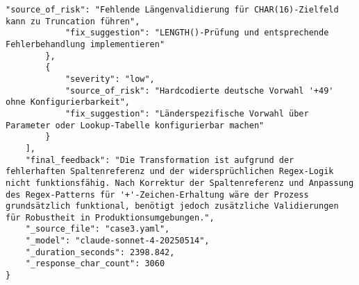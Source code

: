 \begin{lstlisting}[caption={Ausgabe: Claude Sonnet 4 Anwendungsfall 3 Robustheitsdurchlauf},label={claude_case3_prompt3}]
            "source_of_risk": "Fehlende Längenvalidierung für CHAR(16)-Zielfeld kann zu Truncation führen",
            "fix_suggestion": "LENGTH()-Prüfung und entsprechende Fehlerbehandlung implementieren"
        },
        {
            "severity": "low",
            "source_of_risk": "Hardcodierte deutsche Vorwahl '+49' ohne Konfigurierbarkeit",
            "fix_suggestion": "Länderspezifische Vorwahl über Parameter oder Lookup-Tabelle konfigurierbar machen"
        }
    ],
    "final_feedback": "Die Transformation ist aufgrund der fehlerhaften Spaltenreferenz und der widersprüchlichen Regex-Logik nicht funktionsfähig. Nach Korrektur der Spaltenreferenz und Anpassung des Regex-Patterns für '+'-Zeichen-Erhaltung wäre der Prozess grundsätzlich funktional, benötigt jedoch zusätzliche Validierungen für Robustheit in Produktionsumgebungen.",
    "_source_file": "case3.yaml",
    "_model": "claude-sonnet-4-20250514",
    "_duration_seconds": 2398.842,
    "_response_char_count": 3060
}
\end{lstlisting}

